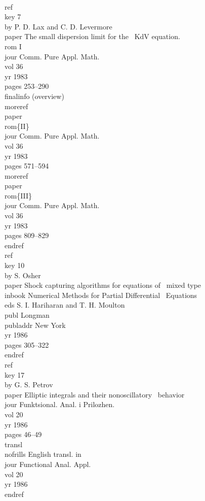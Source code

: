 \beginexample{\exindent=0pt}
\\ref\\key 7
\\by P. D. Lax and C. D. Levermore
\\paper The small dispersion limit for the
\ KdV equation.~\\rom I
\\jour Comm. Pure Appl. Math. \\vol 36 \\yr 1983
\\pages 253--290 \\finalinfo (overview)
\\moreref\\paper \\rom\{II\}
\\jour Comm. Pure Appl. Math. 
\\vol 36 \\yr 1983 \\pages 571--594
\\moreref\\paper \\rom\{III\}
\\jour Comm. Pure Appl. Math. 
\\vol 36 \\yr 1983 \\pages 809--829 \\endref
\ {}
\\ref\\key 10 \\by S. Osher
\\paper Shock capturing algorithms for equations of
\ mixed type
\\inbook Numerical Methods for Partial Differential
\ Equations \\eds S. I. Hariharan and T. H. Moulton
\\publ Longman \\publaddr New York \\yr 1986
\\pages 305--322
\\endref
\ {}
\\ref\\key 17 \\by G. S. Petrov
\\paper Elliptic integrals and their nonoscillatory
\ behavior
\\jour Funktsional. Anal. i Prilozhen.
\\vol 20 \\yr 1986 \\pages 46--49
\\transl\\nofrills English transl. in
\\jour Functional Anal. Appl. \\vol 20\\yr 1986
\\endref
\endexample

